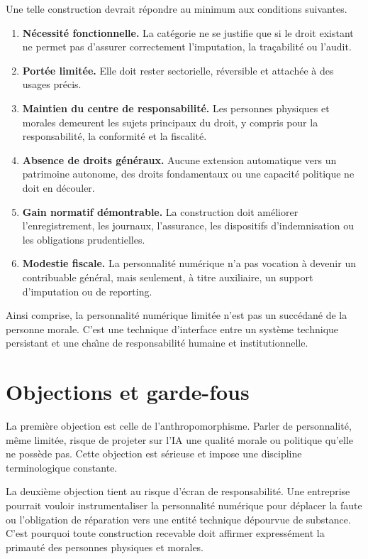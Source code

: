 \documentclass[11pt]{article}
\begin{document}
Une telle construction devrait r{\'e}pondre au minimum aux conditions suivantes.

\begin{enumerate}[leftmargin=1.4em]
  \item \textbf{N{\'e}cessit{\'e} fonctionnelle.} La cat{\'e}gorie ne se justifie que si le droit existant ne permet pas d'assurer correctement l'imputation, la tra{\c c}abilit{\'e} ou l'audit.
  \item \textbf{Port{\'e}e limit{\'e}e.} Elle doit rester sectorielle, r{\'e}versible et attach{\'e}e {\`a} des usages pr{\'e}cis.
  \item \textbf{Maintien du centre de responsabilit{\'e}.} Les personnes physiques et morales demeurent les sujets principaux du droit, y compris pour la responsabilit{\'e}, la conformit{\'e} et la fiscalit{\'e}.
  \item \textbf{Absence de droits g{\'e}n{\'e}raux.} Aucune extension automatique vers un patrimoine autonome, des droits fondamentaux ou une capacit{\'e} politique ne doit en d{\'e}couler.
  \item \textbf{Gain normatif d{\'e}montrable.} La construction doit am{\'e}liorer l'enregistrement, les journaux, l'assurance, les dispositifs d'indemnisation ou les obligations prudentielles.
  \item \textbf{Modestie fiscale.} La personnalit{\'e} num{\'e}rique n'a pas vocation {\`a} devenir un contribuable g{\'e}n{\'e}ral, mais seulement, {\`a} titre auxiliaire, un support d'imputation ou de reporting.
\end{enumerate}

Ainsi comprise, la personnalit{\'e} num{\'e}rique limit{\'e}e n'est pas un succ{\'e}dan{\'e} de la personne morale. C'est une technique d'interface entre un syst{\`e}me technique persistant et une cha{\^\i}ne de responsabilit{\'e} humaine et institutionnelle.

\section{Objections et garde-fous}
La premi{\`e}re objection est celle de l'anthropomorphisme. Parler de personnalit{\'e}, m{\^e}me limit{\'e}e, risque de projeter sur l'IA une qualit{\'e} morale ou politique qu'elle ne poss{\`e}de pas. Cette objection est s{\'e}rieuse et impose une discipline terminologique constante.

La deuxi{\`e}me objection tient au risque d'{\'e}cran de responsabilit{\'e}. Une entreprise pourrait vouloir instrumentaliser la personnalit{\'e} num{\'e}rique pour d{\'e}placer la faute ou l'obligation de r{\'e}paration vers une entit{\'e} technique d{\'e}pourvue de substance. C'est pourquoi toute construction recevable doit affirmer express{\'e}ment la primaut{\'e} des personnes physiques et morales.
\end{document}
